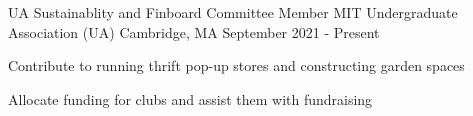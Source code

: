 \documentclass[12pt, letterpaper]{awesome-cv}
\begin{document}
\begin{cventries}
    \cventry
      {UA Sustainablity and Finboard Committee Member} %
      {MIT Undergraduate Association (UA)} %
      {Cambridge, MA} %
      {September 2021 - Present} %
      {
        \begin{cvitems} %
          \item {Contribute to running thrift pop-up stores and constructing garden spaces}
          \item {Allocate funding for clubs and assist them with fundraising}
      \end{cvitems}
    }


  \end{cventries} 


\end{document}
